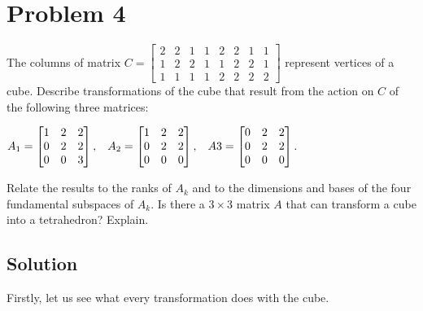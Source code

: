 \documentclass[letterpaper,10pt,english]{jupyterBook}
\begin{document}
\section{Problem 4}
\label{\detokenize{notebooks/ProblemSet1:problem-4}}
\sphinxAtStartPar
The columns of matrix \(C = 
\begin{bmatrix}
2 & 2 & 1 & 1 & 2 & 2 & 1 & 1\\
1 & 2 & 2 & 1 & 1 & 2 & 2 & 1\\
1 & 1 & 1 & 1 & 2 & 2 & 2 & 2
\end{bmatrix}
\)
represent vertices of a cube. Describe transformations of the cube that result from the action on \(C\) of the following three matrices:

\sphinxAtStartPar
\(A_1 = 
\begin{bmatrix}
1 & 2 & 2\\
0 & 2 & 2\\
0 & 0 & 3
\end{bmatrix}, \hspace{3mm}
A_2 = 
\begin{bmatrix}
1 & 2 & 2\\
0 & 2 & 2\\
0 & 0 & 0
\end{bmatrix}, \hspace{3mm}
A3 = 
\begin{bmatrix}
0 & 2 & 2\\
0 & 2 & 2\\
0 & 0 & 0
\end{bmatrix}.
\)

\sphinxAtStartPar
Relate the results to the ranks of \(A_k\) and to the dimensions and bases of the four fundamental subspaces of \(A_k\). Is there a \(3\times3\) matrix \(A\) that can transform a cube into a tetrahedron? Explain.


\subsection{Solution}
\label{\detokenize{notebooks/ProblemSet1:id3}}
\sphinxAtStartPar
Firstly, let us see what every transformation does with the cube.
\end{document}
